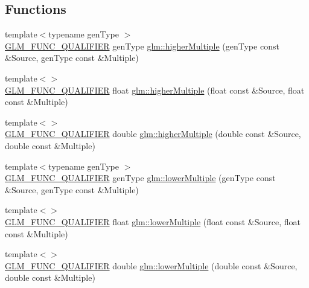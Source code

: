 \subsection*{Functions}
\begin{DoxyCompactItemize}
\item 
{\footnotesize template$<$typename gen\+Type $>$ }\\\hyperlink{setup_8hpp_a33fdea6f91c5f834105f7415e2a64407}{G\+L\+M\+\_\+\+F\+U\+N\+C\+\_\+\+Q\+U\+A\+L\+I\+F\+I\+ER} gen\+Type \hyperlink{group__gtx__multiple_gaa2bb85aaacfdb9366b8365f8d5c7e25d}{glm\+::higher\+Multiple} (gen\+Type const \&Source, gen\+Type const \&Multiple)
\item 
{\footnotesize template$<$$>$ }\\\hyperlink{setup_8hpp_a33fdea6f91c5f834105f7415e2a64407}{G\+L\+M\+\_\+\+F\+U\+N\+C\+\_\+\+Q\+U\+A\+L\+I\+F\+I\+ER} float \hyperlink{namespaceglm_a4afea9468d6dcf0048e2c06db79bc8c7}{glm\+::higher\+Multiple} (float const \&Source, float const \&Multiple)
\item 
{\footnotesize template$<$$>$ }\\\hyperlink{setup_8hpp_a33fdea6f91c5f834105f7415e2a64407}{G\+L\+M\+\_\+\+F\+U\+N\+C\+\_\+\+Q\+U\+A\+L\+I\+F\+I\+ER} double \hyperlink{namespaceglm_a2cd56fa0402782c78e225f1a551bbdc1}{glm\+::higher\+Multiple} (double const \&Source, double const \&Multiple)
\item 
{\footnotesize template$<$typename gen\+Type $>$ }\\\hyperlink{setup_8hpp_a33fdea6f91c5f834105f7415e2a64407}{G\+L\+M\+\_\+\+F\+U\+N\+C\+\_\+\+Q\+U\+A\+L\+I\+F\+I\+ER} gen\+Type \hyperlink{group__gtx__multiple_ga11b955f3cb3589d561c8991118771ea6}{glm\+::lower\+Multiple} (gen\+Type const \&Source, gen\+Type const \&Multiple)
\item 
{\footnotesize template$<$$>$ }\\\hyperlink{setup_8hpp_a33fdea6f91c5f834105f7415e2a64407}{G\+L\+M\+\_\+\+F\+U\+N\+C\+\_\+\+Q\+U\+A\+L\+I\+F\+I\+ER} float \hyperlink{namespaceglm_ac3ba0c930ff55364862b250e88f742df}{glm\+::lower\+Multiple} (float const \&Source, float const \&Multiple)
\item 
{\footnotesize template$<$$>$ }\\\hyperlink{setup_8hpp_a33fdea6f91c5f834105f7415e2a64407}{G\+L\+M\+\_\+\+F\+U\+N\+C\+\_\+\+Q\+U\+A\+L\+I\+F\+I\+ER} double \hyperlink{namespaceglm_ab75ca978940a0ba67a95e13b16cde89e}{glm\+::lower\+Multiple} (double const \&Source, double const \&Multiple)
\end{DoxyCompactItemize}
